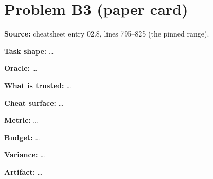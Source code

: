 \documentclass[11pt]{article}
\begin{document}
\section*{Problem B3 (paper card)}\label{ans:B3}
\begin{answer}
\textbf{Source:} cheatsheet entry 02.8, lines 795--825 (the pinned range).

\textbf{Task shape:} \dots

\textbf{Oracle:} \dots

\textbf{What is trusted:} \dots

\textbf{Cheat surface:} \dots

\textbf{Metric:} \dots

\textbf{Budget:} \dots

\textbf{Variance:} \dots

\textbf{Artifact:} \dots
\end{answer}
\end{document}
